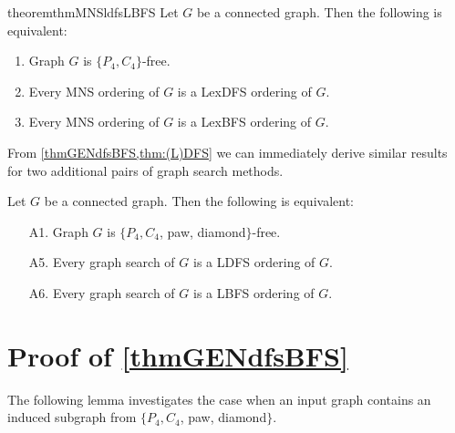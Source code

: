 \documentclass{svproc}
\begin{document}
\begin{restatable}{theorem}{thmMNSldfsLBFS}
\label{thm:thmMNSldfsLBFS}
Let $G$ be a connected graph. Then the following is equivalent:  
\begin{enumerate}[nosep, labelindent=\parindent,leftmargin=*, label = C\arabic*.]
    \item \label{it:P4C4free}Graph $G$ is $\{P_4,C_4\}$-free.
    \item \label{it:mnsLDFS}Every MNS ordering of $G$ is a LexDFS ordering of $G$.
    \item \label{it:mnsLBFS}Every MNS ordering of $G$ is a LexBFS ordering of $G$.
\end{enumerate}
\end{restatable}


From \cref{thmGENdfsBFS,thm:(L)DFS} we can immediately derive similar results for two additional pairs of graph search methods.

\begin{corollary}
\label{thmGENldfsLBFS}
Let $G$ be a connected graph. Then the following is equivalent: 
\begin{enumerate}[nosep, labelindent=\parindent,leftmargin=*]
    \item[A1.] Graph $G$ is $\{P_4, C_4$, paw, diamond$\}$-free.
    \item[A5.] \label{it:gen-LDFS}Every graph search of $G$ is a LDFS ordering of $G$.
    \item[A6.] \label{it:gen-LBFS}Every graph search of $G$ is a LBFS ordering of $G$.
 \end{enumerate}
\end{corollary}
\section{Proof of \cref{thmGENdfsBFS}}\label{sec:P4-C4-pan-diamond}
The following lemma investigates the case when an input graph contains an induced subgraph from $\{P_4, C_4$, paw, diamond$\}$.
\end{document}
